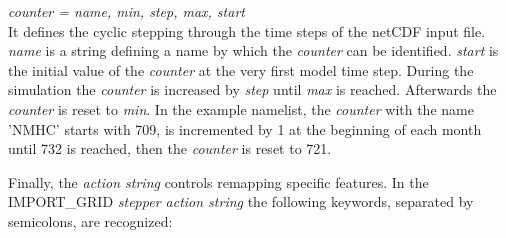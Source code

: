 \documentclass[11pt,twoside]{report}
\begin{document}
{\it counter = name, min, step, max, start}\\

It defines the cyclic stepping through the time steps of the netCDF
input file. {\it name} is a  
string defining a name by which the {\it counter} can be
identified. {\it start} is the initial 
value of the {\it counter} at the very first model time step.
 During the simulation the {\it counter} is increased by {\it step} until {\it max} is reached. Afterwards 
the {\it counter} is reset to {\it min}. In the example namelist, the {\it counter} with the name ’NMHC’
 starts with 709, is incremented by 1 at the beginning of each month until 732 is reached, then 
the {\it counter} is reset to 721.

Finally, the {\it  action string} controls remapping specific features. In the IMPORT\_GRID
{\it stepper action string} the following keywords, separated by semicolons, are recognized:\\
\end{document}
